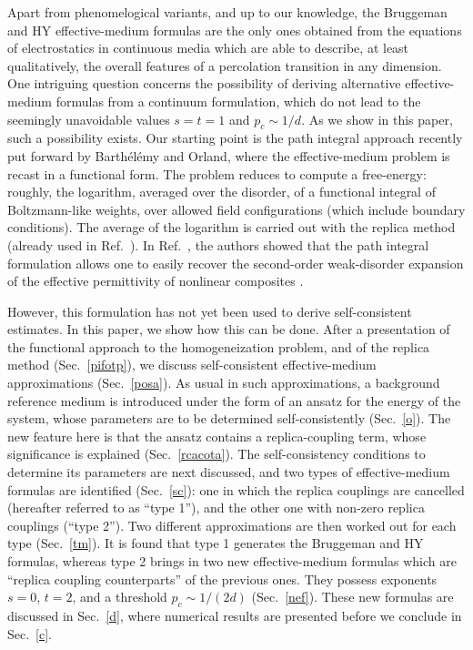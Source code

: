 Apart from phenomelogical variants, and up to our knowledge,
the Bruggeman and HY effective-medium formulas are
the only ones obtained from the equations of
electrostatics in continuous media which are able to describe, at least
qualitatively, the overall features of a percolation transition in any
dimension. One intriguing question concerns the possibility of deriving
alternative effective-medium formulas from a continuum formulation, which
do not lead to the seemingly unavoidable values $s=t=1$ and $p_c\sim
1/d$. As we show in this paper, such a possibility exists. Our starting
point is the path integral approach recently put forward by
Barth\'{e}l\'{e}my and Orland\cite{BART98}, where the effective-medium
problem is recast in a functional form. The problem reduces to
compute a free-energy: roughly, the logarithm, averaged over the
disorder, of a functional integral of Boltzmann-like weights, over
allowed field configurations (which include boundary conditions). The
average of the logarithm is carried out with the replica method (already
used in Ref.\ \cite{STEP77}). In Ref.\ \cite{BART98}, the authors showed
that the path integral formulation
allows one to easily recover the second-order
weak-disorder expansion of the effective permittivity of nonlinear
composites \cite{BLUM91}.

However, this formulation
has not yet been used to derive self-consistent estimates.
In this paper, we show how this can be done.
After a presentation of the functional approach to the homogeneization
problem, and of the replica method (Sec.\ \ref{pifotp}),
we discuss self-consistent effective-medium
approximations (Sec.\ \ref{posa}). As usual
in such approximations, a background reference medium is introduced under the
form of an ansatz for the energy of the system,
whose parameters are to be
determined self-consistently (Sec.\ \ref{o}).
The new feature here is that the ansatz
contains a replica-coupling term, whose significance is
explained (Sec.\ \ref{rcacota}).
The self-consistency conditions to determine its parameters
are next discussed,
and two types of effective-medium formulas are identified (Sec.\ \ref{sc}):
one in which the replica couplings are cancelled
(hereafter referred to as ``type 1''),
and the other one with non-zero replica couplings (``type 2'').
Two different approximations are then worked out for each type
(Sec.\ \ref{tm}). It is found that
type 1 generates the Bruggeman and HY formulas,
whereas type 2 brings in two new effective-medium formulas which
are ``replica coupling counterparts'' of the previous ones.
They possess exponents $s=0$, $t=2$, and
a threshold $p_c\sim 1/(2d)$ (Sec.\ \ref{nef}).
These new formulas are discussed in Sec.\ \ref{d},
where numerical results are presented
before we conclude in Sec.\ \ref{c}.

